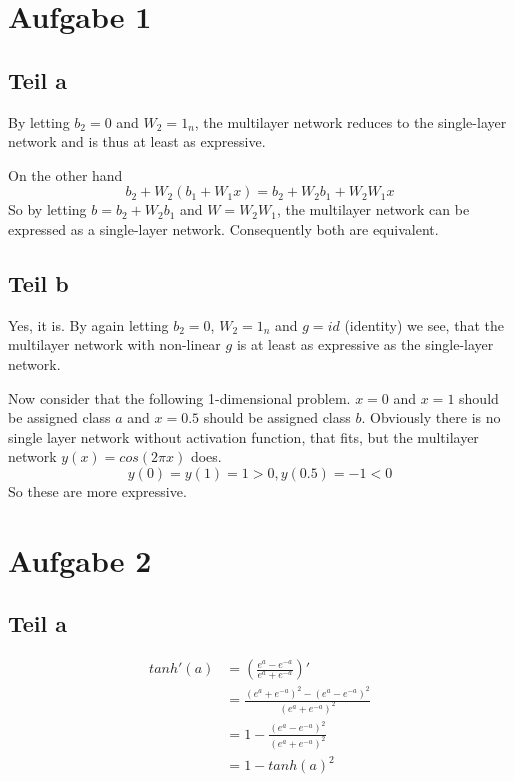 \documentclass[10pt,a4paper]{article}
\begin{document}
\section{Aufgabe 1}

\subsection{Teil a}

By letting $b_{2} = 0$ and $W_{2} = 1_{n}$, the multilayer network reduces to
the single-layer network and is thus at least as expressive.

On the other hand
\begin{equation}
  b_{2} + W_{2}(b_{1} + W_{1}x) = b_{2} + W_{2}b_{1} + W_{2}W_{1}x
\end{equation}
So by letting $b = b_{2} + W_{2}b_{1}$ and $W = W_{2}W_{1}$, the multilayer
network can be expressed as a single-layer network. Consequently both are
equivalent.

\subsection{Teil b}

Yes, it is. By again letting $b_{2} = 0$, $W_{2} = 1_{n}$ and $g = id$
(identity) we see, that the multilayer network with non-linear $g$ is at least
as expressive as the single-layer network.

Now consider that the following 1-dimensional problem. $x = 0$ and $x = 1$
should be assigned class $a$ and $x = 0.5$ should be assigned class
$b$. Obviously there is no single layer network without activation function,
that fits, but the multilayer network $y(x) = cos(2\pi x)$ does.
\begin{equation}
  y(0) = y(1) = 1 > 0, y(0.5) = -1 < 0
\end{equation}
So these are more expressive.

\section{Aufgabe 2}

\subsection{Teil a}

\begin{align*}
  tanh'(a) & = \left( \frac{e^{a} - e^{-a}}{e^{a} + e^{-a}} \right)'\\
           & = \frac{(e^{a} + e^{-a})^{2} - (e^{a} - e^{-a})^{2}}{(e^{a} + e^{-a})^{2}}\\
           & = 1 - \frac{(e^{a} - e^{-a})^{2}}{(e^{a} + e^{-a})^{2}}\\
           & = 1 - tanh(a)^{2}
\end{align*}
\end{document}
